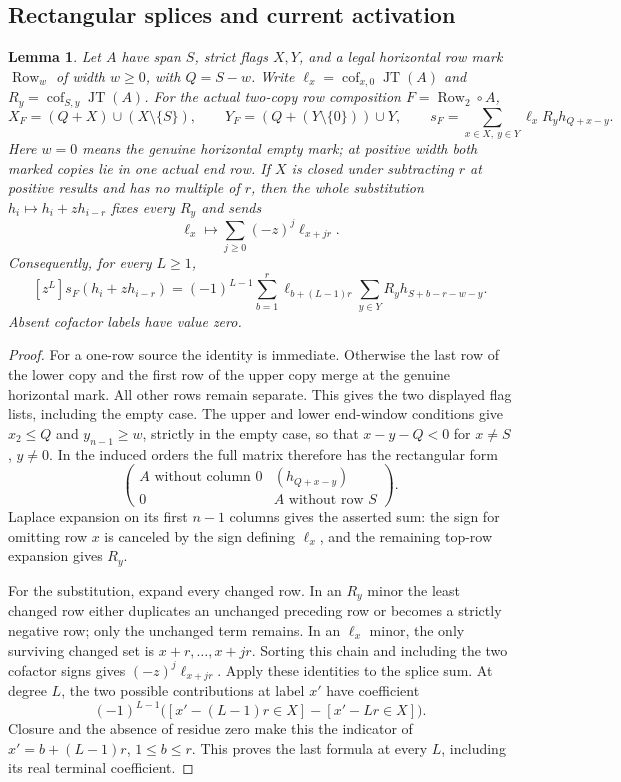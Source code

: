 \documentclass[11pt,a4paper]{amsart}
\numberwithin{equation}{section}
\theoremstyle{plain}
\newtheorem{lemma}[theorem]{Lemma}
\theoremstyle{definition}
\newcommand{\Row}{\operatorname{Row}}
\newcommand{\JT}{\operatorname{JT}}
\begin{document}
\subsection{Rectangular splices and current activation}

\begin{lemma}\label{ph:rectangular-splice}
Let \(A\) have span \(S\), strict flags \(X,Y\), and a legal horizontal
row mark \(\Row_w\) of width \(w\ge0\), with \(Q=S-w\).  Write
\(\ell_x=\operatorname{cof}_{x,0}\JT(A)\) and
\(R_y=\operatorname{cof}_{S,y}\JT(A)\).
For the actual two-copy row composition \(F=\Row_2\circ A\),
\[
 X_F=(Q+X)\cup(X\setminus\{S\}),\qquad
 Y_F=(Q+(Y\setminus\{0\}))\cup Y,
 \qquad
 s_F=\sum_{x\in X,\ y\in Y}\ell_xR_yh_{Q+x-y}.
\]
Here \(w=0\) means the genuine horizontal empty mark; at positive
width both marked copies lie in one actual end row.  If \(X\) is closed
under subtracting \(r\) at positive results and has no multiple of \(r\),
then the whole substitution \(h_i\mapsto h_i+zh_{i-r}\) fixes every \(R_y\)
and sends
\[
 \ell_x\longmapsto\sum_{j\ge0}(-z)^j\ell_{x+jr}.
\]
Consequently, for every \(L\ge1\),
\[
 [z^L]s_F(h_i+zh_{i-r})
 =(-1)^{L-1}\sum_{b=1}^{r}\ell_{b+(L-1)r}
                   \sum_{y\in Y}R_yh_{S+b-r-w-y}.
\]
Absent cofactor labels have value zero.
\end{lemma}
\begin{proof}
For a one-row source the identity is immediate.  Otherwise the last
row of the lower copy and the first row of the upper copy merge
at the genuine horizontal mark.  All other rows remain separate.  This
gives the two displayed flag lists, including the empty case.  The upper
and lower end-window conditions give
\(x_2\le Q\) and \(y_{n-1}\ge w\), strictly in the empty case, so that
\(x-y-Q<0\) for \(x\ne S\), \(y\ne0\).
In the induced orders the full matrix therefore has the rectangular form
\[
 \begin{pmatrix} A\text{ without column }0&(h_{Q+x-y})\\
                  0&A\text{ without row }S
 \end{pmatrix}.
\]
Laplace expansion on its first \(n-1\) columns gives the asserted sum:
the sign for omitting row \(x\) is canceled by the sign defining
\(\ell_x\), and the remaining top-row expansion gives \(R_y\).

For the substitution, expand every changed row.  In an \(R_y\) minor the
least changed row either duplicates an unchanged preceding row or
becomes a strictly negative row; only the unchanged term remains.
In an \(\ell_x\) minor, the only surviving changed set is
\(x+r,\ldots,x+jr\).  Sorting this chain and including the two cofactor
signs gives \((-z)^j\ell_{x+jr}\).
Apply these identities to the splice sum.  At degree \(L\), the two
possible contributions at label \(x'\) have coefficient
\[
 (-1)^{L-1}
 \bigl([x'-(L-1)r\in X]-[x'-Lr\in X]\bigr).
\]
Closure and the absence of residue zero make this the indicator of
\(x'=b+(L-1)r\), \(1\le b\le r\).  This proves the last formula at
every \(L\), including its real terminal coefficient.
\end{proof}
\end{document}
